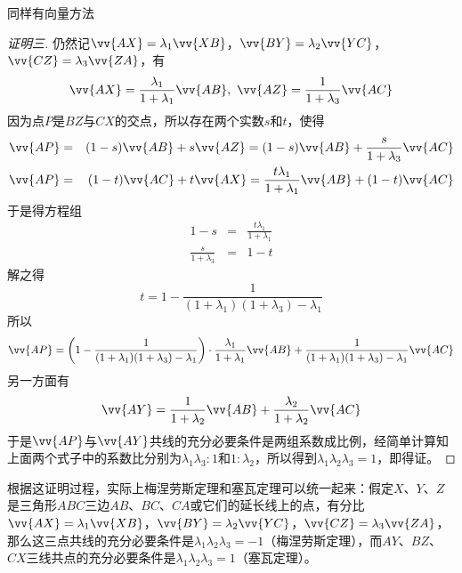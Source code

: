 同样有向量方法
\begin{proof}[证明三]
  仍然记$\vv{AX}=\lambda_1\vv{XB}$，$\vv{BY}=\lambda_2\vv{YC}$，$\vv{CZ}=\lambda_3\vv{ZA}$，有
  \begin{equation*}
    \vv{AX}=\frac{\lambda_1}{1+\lambda_{1}}\vv{AB}, \ \vv{AZ}=\frac{1}{1+\lambda_3}\vv{AC}
  \end{equation*}
  因为点$P$是$BZ$与$CX$的交点，所以存在两个实数$s$和$t$，使得
  \begin{eqnarray*}
    \vv{AP} &=& (1-s)\vv{AB}+s\vv{AZ} = (1-s)\vv{AB}+\frac{s}{1+\lambda_3}\vv{AC} \\
    \vv{AP} &=& (1-t)\vv{AC}+t\vv{AX} =  \frac{t\lambda_1}{1+\lambda_{1}}\vv{AB}+(1-t)\vv{AC}
  \end{eqnarray*}
  于是得方程组
  \begin{eqnarray}
    1-s &=&  \frac{t\lambda_1}{1+\lambda_{1}} \\
    \frac{s}{1+\lambda_3} &=& 1-t
  \end{eqnarray}
  解之得
  \begin{equation*}
    t = 1- \frac{1}{(1+\lambda_1)(1+\lambda_3)-\lambda_1}
  \end{equation*}
  所以
  \begin{equation*}
    \vv{AP}
    = \left( 1- \frac{1}{(1+\lambda_1)(1+\lambda_3)-\lambda_1} \right) \cdot \frac{\lambda_1}{1+\lambda_{1}} \vv{AB}+\frac{1}{(1+\lambda_1)(1+\lambda_3)-\lambda_1}\vv{AC}
  \end{equation*}
  另一方面有
  \begin{equation*}
    \vv{AY}=\frac{1}{1+\lambda_2}\vv{AB}+\frac{\lambda_2}{1+\lambda_2}\vv{AC}
  \end{equation*}
  于是$\vv{AP}$与$\vv{AY}$共线的充分必要条件是两组系数成比例，经简单计算知上面两个式子中的系数比分别为$\lambda_1\lambda_3 : 1$和$1 : \lambda_2$，所以得到$\lambda_1\lambda_2\lambda_3=1$，即得证。
\end{proof}

\begin{example}[梅涅劳斯定理与塞瓦定理的统一]
根据这证明过程，实际上梅涅劳斯定理和塞瓦定理可以统一起来：假定$X$、$Y$、$Z$是三角形$ABC$三边$AB$、$BC$、$CA$或它们的延长线上的点，有分比$\vv{AX}=\lambda_1\vv{XB}$，$\vv{BY}=\lambda_2\vv{YC}$，$\vv{CZ}=\lambda_3\vv{ZA}$，那么这三点共线的充分必要条件是$\lambda_1\lambda_2\lambda_3=-1$（梅涅劳斯定理），而$AY$、$BZ$、$CX$三线共点的充分必要条件是$\lambda_1\lambda_2\lambda_3=1$（塞瓦定理）。
\end{example}

